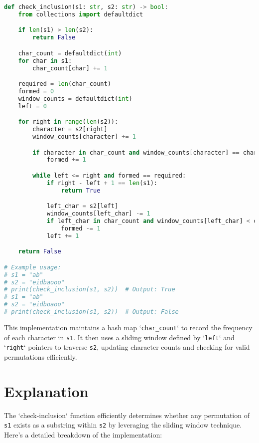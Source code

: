 \begin{fullwidth}
\begin{lstlisting}[language=Python]
def check_inclusion(s1: str, s2: str) -> bool:
    from collections import defaultdict

    if len(s1) > len(s2):
        return False

    char_count = defaultdict(int)
    for char in s1:
        char_count[char] += 1

    required = len(char_count)
    formed = 0
    window_counts = defaultdict(int)
    left = 0

    for right in range(len(s2)):
        character = s2[right]
        window_counts[character] += 1

        if character in char_count and window_counts[character] == char_count[character]:
            formed += 1

        while left <= right and formed == required:
            if right - left + 1 == len(s1):
                return True

            left_char = s2[left]
            window_counts[left_char] -= 1
            if left_char in char_count and window_counts[left_char] < char_count[left_char]:
                formed -= 1
            left += 1

    return False

# Example usage:
# s1 = "ab"
# s2 = "eidbaooo"
# print(check_inclusion(s1, s2))  # Output: True
# s1 = "ab"
# s2 = "eidboaoo"
# print(check_inclusion(s1, s2))  # Output: False
\end{lstlisting}
\end{fullwidth}

This implementation maintains a hash map `\texttt{char\_count}` to record the frequency of each character in \texttt{s1}. It then uses a sliding window defined by `\texttt{left}` and `\texttt{right}` pointers to traverse \texttt{s2}, updating character counts and checking for valid permutations efficiently.

\section*{Explanation}

The `check-inclusion` function efficiently determines whether any permutation of \texttt{s1} exists as a substring within \texttt{s2} by leveraging the sliding window technique. Here's a detailed breakdown of the implementation:

